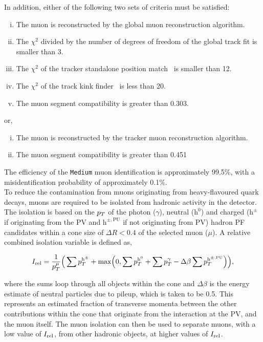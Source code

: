 In addition, either of the following two sets of criteria must be satisfied:

\begin{enumerate}[i)]
\item The muon is reconstructed by the global muon reconstruction algorithm.
\item The $\chi^2$ divided by the number of degrees of freedom of the global track fit is smaller than 3.
\item The $\chi^2$ of the tracker standalone position match~\cite{CMS:2009fdy} is smaller than 12.
\item The $\chi^2$ of the track kink finder~\cite{CMS:2018rym} is less than 20.
\item The muon segment compatibility is greater than 0.303.
\end{enumerate}

or,

\begin{enumerate}[i)]
\item The muon is reconstructed by the tracker muon reconstruction algorithm.
\item The muon segment compatibility is greater than 0.451 
\end{enumerate}

The efficiency of the \texttt{Medium} muon identification is approximately 99.5\%, with a misidentification probability of approximately 0.1\%. \\

To reduce the contamination from muons originating from heavy-flavoured quark decays, muons are required to be isolated from hadronic activity in the detector. 
The isolation is based on the $p_{T}$ of the photon ($\gamma$), neutral ($\text{h}^0$) and charged ($\text{h}^{\pm}$ if originating from the \ac{PV} and $\text{h}^{\pm,\text{PU}}$ if not originating from \ac{PV}) hadron \ac{PF} candidates within a cone size of $\Delta R<0.4$ of the selected muon ($\mu$). 
A relative combined isolation variable is defined as,

\begin{equation}
\label{eqn:reliso}
I_{\text{rel}} = \frac{1}{p_{T}^{\mu}} \Big( \sum p_{T}^{\text{h}^{\pm}} + \text{max}\Big( 0, \sum p_{T}^{\text{h}^0} + \sum p_{T}^{\gamma} - \Delta \beta \sum p_{T}^{\text{h}^{\pm, \text{PU}}} \Big) \Big),
\end{equation}

where the sums loop through all objects within the cone and $\Delta \beta$ is the energy estimate of neutral particles due to pileup, which is taken to be 0.5.
This represents an estimated fraction of transverse momenta between the other contributions within the cone that originate from the interaction at the \ac{PV}, and the muon itself.
The muon isolation can then be used to separate muons, with a low value of $I_{\text{rel}}$, from other hadronic objects, at higher values of $I_{\text{rel}}$.

